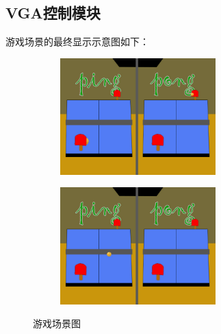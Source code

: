 \documentclass[UTF8]{article}
\begin{document}
\subsection{VGA控制模块}
游戏场景的最终显示示意图如下：
\begin{figure}
  \centering
  \begin{subfigure}{.5\textwidth}
  \centering
  \includegraphics[width=6cm]{2-9a.jpg}
  \caption{ }
  \end{subfigure}%
  \begin{subfigure}{.5\textwidth}
  \centering
  \includegraphics[width=6cm]{2-9b.jpg}
  \caption{ }
\end{subfigure}
\caption{游戏场景图}
\label{fig:game}
\end{figure}
\end{document}
